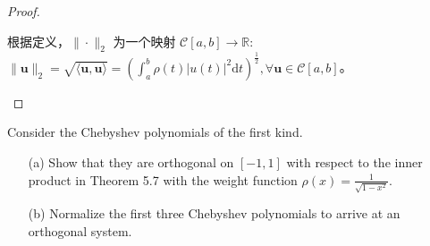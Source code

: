 \documentclass[lang=cn,a4paper,newtx,bibend=bibtex]{elegantpaper}
\newcommand{\uB}{\bm{u}}
\newcommand{\RBB}{\mathbb{R}}
\newcommand{\CM}{\mathcal{C}}
\begin{document}
\begin{proof}
\begin{enumerate}
根据定义，$\| \cdot \|_2 $ 为一个映射 $\CM[a, b] \to \RBB$: $\| \uB \|_2 = \sqrt{\langle \uB, \uB \rangle} =  \left(\int_a^b \rho(t)|u(t)|^2\mathrm{d}t\right)^{\frac12}, \forall \uB \in \CM[a, b]$。
\end{enumerate}

\end{proof}

\begin{prob}[5.6.1-\textrm{II}]
Consider the Chebyshev polynomials of the first kind.

\begin{enumerate}
  \item[(a)] Show that they are orthogonal on $[-1, 1]$ with respect to the 
              inner product in Theorem 5.7 with the weight function $\rho(x) = \frac{1}{\sqrt{1 - x^2}}$.
  \item[(b)] Normalize the first three Chebyshev polynomials to arrive at an orthogonal system.
\end{enumerate}
\end{prob}
\end{document}
